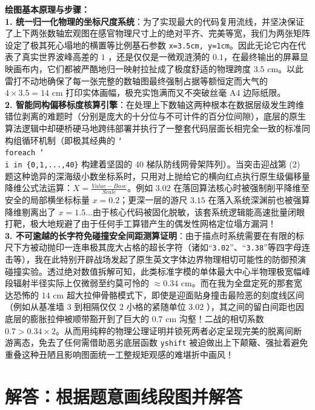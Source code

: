 \documentclass[12pt, a4paper]{ctexrep}
\begin{document}
{\small\color{blue!70!black}
\textbf{绘图基本原理与步骤：}\\
\textbf{1. 统一归一化物理的坐标尺度系统}：为了实现最大的代码复用流线，并坚决保证了上下两张数轴宏观图在感官物理尺寸上的绝对平齐、完美等宽，我们为两张矩阵设定了极其死心塌地的横置等比例基石参数 \texttt{x=3.5cm, y=1cm}。因此无论它内在代表了真实世界波峰高差的 $1$ ，还是仅仅是一微观涟漪的 $0.1$，在最终输出的屏幕显映画布内，它们都被严酷地归一映射拉扯成了极度舒适的物理跨度 $3.5\text{ cm}$。以此雷打不动地确保了每一张完整的数轴图最终强制占据等额恒定而大气的 $4 \times 3.5 = 14\text{ cm}$ 打印实体画幅，极充实饱满而又不突破丝毫 A4 边际纸限。\\
\textbf{2. 智能同构偏移标度核算引擎}：在处理上下数轴这两种根本在数据层级发生跨维错位剥离的难题时（分别是庞大的十分位与不可计件的百分位间隙），底层的原生算法逻辑中却硬桥硬马地跨纬部署并执行了一整套代码层面长相完全一致的标准同构组循环机制（即极其经典的 \texttt{\char`\\foreach \char`\\i in \{0,1,...,40\}} 构建着坚固的 40 梯队防线网骨架阵列）。当突击迎战第 (2) 题这种诡异的深海级小数坐标系时，只用对上抛给它的横向红点执行原生级偏移量降维公式法运算：$X = \frac{Value - Base}{Scale}$。例如 $3.02$ 在落回算法核心时被强制削平降维至安全的局部横坐标标量 $x = 0.2$；更深一层的游尺 $3.15$ 在落入系统深渊前也被强算降维剔离出了 $x = 1.5$...由于核心代码被固化脱敏，该套系统逻辑能高速批量闭眼打靶，极大地规避了由于任何手工算错产生的偶发性网格定位塌方漏洞！\\
\textbf{3. 不可逾越的长字符免碰撞安全间距测算证明}：由于描点时系统需要在有限的标尺下方被动抛印一连串极其庞大占格的超长字符（诸如“\texttt{3.02}”、“\texttt{3.38}”等四字母连击等），我在此特别开辟战场发起了原生英文字体边界物理相切可能性的防御预演碰撞实验。透过绝对数值拆解可知，此类标准字模的单体最大中心半物理极宽幅峰段辐射半径实际上仅微弱至约莫可怜的 $\approx0.34\text{ cm}$。而在我为全盘定死的那套宽达恐怖的 $14\text{ cm}$ 超大拉伸骨骼模式下，即使是迎面贴身撞击最险恶的刻度线区间（例如从基准墙 $3$ 到相隔仅仅 $2$ 小格的紧随单位 $3.02$ ），其之间的留白间距也因底层的膨胀拉伸被顺带豁开到了巨大的 $0.7\text{ cm}$ 沟壑！二战的相切系数 $0.7 > 0.34\times2$。从而用纯粹的物理公理证明并锁死两者必定呈现完美的脱离间断游离态，免去了任何需借助恶劣底层函数 \texttt{yshift} 被迫做出上下颠簸、强扯着避免重叠这种丑陋且影响图面统一工整规矩观感的难堪折中画风！
}


\newpage

\section{解答：根据题意画线段图并解答}
\end{document}
